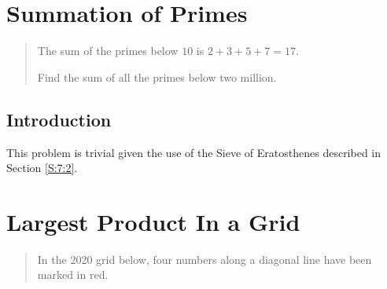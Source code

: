 \documentclass[oneside,12pt]{book}   	%
\newcounter{ex}
\newcounter{pr}
\theoremstyle{definition}
\begin{document}
\begin{spacing}{1.618}
	\chapter{Summation of Primes}
	
		\begin{quote}
			The sum of the primes below $10$ is $2 + 3 + 5 + 7 = 17$.

			Find the sum of all the primes below two million.
		\end{quote}
		
		\section{Introduction}
			This problem is trivial given the use of the Sieve of Eratosthenes described in Section \ref{S:7:2}. 
			
			
	
	\chapter{Largest Product In a Grid}
	
		\begin{quote}
			In the 2020 grid below, four numbers along a diagonal line have been marked in red.


\end{quote}
\end{spacing}
\end{document}
